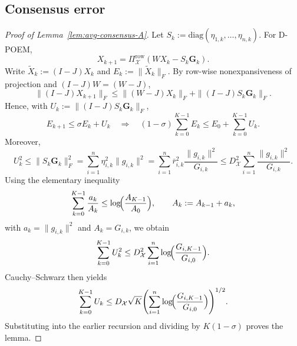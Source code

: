 \documentclass[runningheads]{llncs}
\begin{document}
\subsection{Consensus error}
\begin{proof}[Proof of Lemma~\ref{lem:avg-consensus-A}]
Let \(S_k:=\mathrm{diag}(\eta_{1,k},\dots,\eta_{n,k})\). For D-POEM,
\[
X_{k+1}
=
\Pi_{\mathcal{X}}^{\mathrm{row}}\!\left(WX_k-S_k\mathbf G_k\right).
\]
Write \(\widetilde X_k:=(I-J)X_k\) and \(E_k:=\|\widetilde X_k\|_F\).
By row-wise nonexpansiveness of projection and \((I-J)W=(W-J)\),
\[
\|(I-J)X_{k+1}\|_F
\le
\|(W-J)X_k\|_F+\|(I-J)S_k\mathbf G_k\|_F.
\]
Hence, with \(U_k:=\|(I-J)S_k\mathbf G_k\|_F\),
\[
E_{k+1}\le \sigma E_k+U_k
\quad\Longrightarrow\quad
(1-\sigma)\sum_{k=0}^{K-1}E_k\le E_0+\sum_{k=0}^{K-1}U_k.
\]
Moreover,
\[
U_k^2
\le
\|S_k\mathbf G_k\|_F^2
=
\sum_{i=1}^{n}\eta_{i,k}^2\|g_{i,k}\|^2
=
\sum_{i=1}^{n}\bar r_{i,k}^2\frac{\|g_{i,k}\|^2}{G_{i,k}}
\le
D_{\mathcal{X}}^2\sum_{i=1}^{n}\frac{\|g_{i,k}\|^2}{G_{i,k}}.
\]
Using the elementary inequality
\[
\sum_{k=0}^{K-1}\frac{a_k}{A_k}\le \log\!\Bigl(\frac{A_{K-1}}{A_0}\Bigr),
\qquad
A_k:=A_{k-1}+a_k,
\]
with \(a_k=\|g_{i,k}\|^2\) and \(A_k=G_{i,k}\), we obtain
\[
\sum_{k=0}^{K-1}U_k^2
\le
D_{\mathcal{X}}^2\sum_{i=1}^{n}\log\!\Bigl(\frac{G_{i,K-1}}{G_{i,0}}\Bigr).
\]
Cauchy--Schwarz then yields
\[
\sum_{k=0}^{K-1}U_k
\le
D_{\mathcal{X}}\sqrt{K}
\Biggl(\sum_{i=1}^{n}\log\!\Bigl(\frac{G_{i,K-1}}{G_{i,0}}\Bigr)\Biggr)^{1/2}.
\]
Substituting into the earlier recursion and dividing by \(K(1-\sigma)\)
proves the lemma.
\end{proof}
\end{document}
